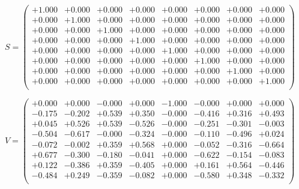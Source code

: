 \documentclass[9pt]{article}
\theoremstyle{plain}
\theoremstyle{definition}
\theoremstyle{remark}
\numberwithin{equation}{section}
\begin{document}
$S = \left(
\begin{array}{
cccccccc}
+1.000 & +0.000 & +0.000 & +0.000 & +0.000 & +0.000 & +0.000 & +0.000 \\
+0.000 & +1.000 & +0.000 & +0.000 & +0.000 & +0.000 & +0.000 & +0.000 \\
+0.000 & +0.000 & +1.000 & +0.000 & +0.000 & +0.000 & +0.000 & +0.000 \\
+0.000 & +0.000 & +0.000 & +1.000 & +0.000 & +0.000 & +0.000 & +0.000 \\
+0.000 & +0.000 & +0.000 & +0.000 & +1.000 & +0.000 & +0.000 & +0.000 \\
+0.000 & +0.000 & +0.000 & +0.000 & +0.000 & +1.000 & +0.000 & +0.000 \\
+0.000 & +0.000 & +0.000 & +0.000 & +0.000 & +0.000 & +1.000 & +0.000 \\
+0.000 & +0.000 & +0.000 & +0.000 & +0.000 & +0.000 & +0.000 & +1.000 \\
\end{array}
\right)$ \newline 

$V = \left(
\begin{array}{
cccccccc}
+0.000 & +0.000 & -0.000 & +0.000 & -1.000 & -0.000 & +0.000 & +0.000 \\
-0.175 & -0.202 & +0.539 & +0.350 & -0.000 & -0.416 & +0.316 & +0.493 \\
+0.045 & +0.526 & +0.539 & -0.526 & -0.000 & -0.251 & -0.301 & -0.003 \\
-0.504 & -0.617 & -0.000 & -0.324 & -0.000 & -0.110 & -0.496 & +0.024 \\
-0.072 & -0.002 & +0.359 & +0.568 & +0.000 & -0.052 & -0.316 & -0.664 \\
+0.677 & -0.300 & -0.180 & -0.041 & +0.000 & -0.622 & -0.154 & -0.083 \\
+0.122 & -0.386 & +0.359 & -0.405 & +0.000 & +0.161 & +0.564 & -0.446 \\
-0.484 & +0.249 & -0.359 & -0.082 & +0.000 & -0.580 & +0.348 & -0.332 \\
\end{array}
\right)$ \newline 
\end{document}
